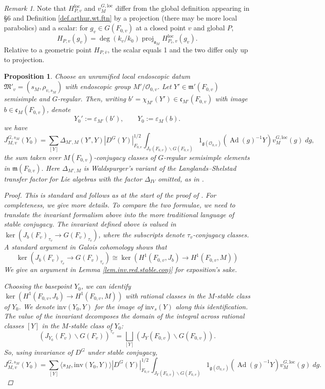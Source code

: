 \documentclass[openany]{amsbook}
\newtheorem{proposition}[theorem]{Proposition}
\theoremstyle{definition}
\theoremstyle{remark}
\newtheorem{remark}[theorem]{Remark}
\numberwithin{equation}{section}
\renewcommand{\O}{\mathcal{O}}
\newcommand{\ol}[1]{\overline{#1}}
\renewcommand{\epsilon}{\varepsilon}
\renewcommand{\-}{\operatorname{-}}
\renewcommand{\a}{\mathfrak{a}}
\newcommand{\on}[1]{\operatorname{#1}}
\newcommand{\fm}{\mathfrak{m}}
\newcommand{\fc}{\mathfrak{c}}
\renewcommand{\fm}{\mathfrak{m}}
\renewcommand{\fg}{\mathfrak{g}}
\newcommand{\fM}{\mathfrak{M}}
\newcommand{\Ad}{\on{Ad}}
\newcommand{\inv}{\mathrm{inv}}
\newcommand{\loc}{\mathrm{loc}}
\begin{document}
\begin{remark}
    Note that $H_{P,v}^{\loc}$ and $v_M^{G, \loc}$ differ from the global definition appearing in \S 6 and Definition \ref{def.arthur.wt.ftn} by a projection (there may be more local parabolics) and a scalar: for $g_v \in G(F_{0,v})$ at a closed point $v$ and global $P$,
    $$
        H_{P,v}(g_v) = \deg(k_v/k_0) \on{proj}_{\a_M} H_{P_v,v}^{\loc}(g_v).
    $$
    Relative to a geometric point $H_{P, \ol{v}}$, the scalar equals 1 and the two differ only up to projection.
\end{remark}

\begin{proposition}\label{prop.comparison.local.s}
    Choose an unramified local endoscopic datum $\fM'_v = (s_M, \rho_{v,s_M})$ with endoscopic group $M'/\O_{0,v}$. Let $Y' \in \fm'(F_{0,v})$ semisimple and $G$-regular. Then, writing $b' = \chi_{M'}(Y') \in \fc_{M'}(F_{0,v})$ with image $b \in \fc_M(F_{0,v})$, denote
    $$
        Y_0' := \epsilon_{M'}(b'), \qquad Y_0 := \epsilon_{M}(b).
    $$
    we have
    $$
        J^{G,s_M}_{M,v}(Y_0) = \sum_{[Y]} \Delta_{M',M}(Y',Y) |D^G(Y)|^{1/2}_{F_{0,v}} \int_{J_Y(F_{0,v})\backslash G(F_{0,v})} 1_{\fg(\O_{0,v})}(\Ad(g)^{-1} Y) v_M^{G,\loc}(g) \; dg,
    $$
    the sum taken over $M(F_{0,v})$-conjugacy classes of $G$-regular semisimple elements in $\fm(F_{0,v})$. Here $\Delta_{M', M}$ is Waldspurger's variant of the Langlands--Shelstad transfer factor for Lie algebras with the factor $\Delta_{IV}$ omitted, as in \cite{waldFLimpliquetransfert}.
    \begin{proof}
        This is standard and follows as at the start of the proof of \cite[Theorem 19.1.1]{CLII}. For completeness, we give more details. To compare the two formulae, we need to translate the invariant formalism above into the more traditional language of stable conjugacy. The invariant defined above is valued in $\ker(J_b(F_v)_{\tau_v} \to G(F_v)_{\tau_v})$, where the subscripts denote ${\tau_v}$-conjugacy classes. A standard argument in Galois cohomology shows that 
        $$
            \ker(J_b(F_v)_{\tau_v} \to G(F_v)_{\tau_v}) \cong \ker(H^1(F_{0,v}, J_b) \to H^1(F_{0,v}, M))
        $$
        We give an argument in Lemma \ref{lem.inv.red.stable.conj} for exposition's sake.

        Choosing the basepoint $Y_0$, we can identify $\ker(H^1(F_{0,v}, J_b) \to H^1(F_{0,v}, M))$ with rational classes in the $M$-stable class of $Y_0$. We denote $\inv(Y_0, Y)$ for the image of $\inv_{s}(Y)$ along this identification. The value of the invariant decomposes the domain of the integral across rational classes $[Y]$ in the $M$-stable class of $Y_0$:
        $$
            (J_{Y_0}(F_v)\backslash G(F_v))^{{\tau_v}} = \bigsqcup_{[Y]} (J_Y(F_{0,v}) \backslash G(F_{0,v})).
        $$
        So, using invariance of $D^G$ under stable conjugacy,
        $$
            J_{M,v}^{G,s_M}(Y_0) = \sum_{[Y]} \langle s_M, \inv(Y_0, Y) \rangle |D^G(Y)|^{1/2}_{F_{0,v}} \int_{J_Y(F_{0,v}) \backslash G(F_{0,v})} 1_{\fg(\O_{0,v})}(\Ad(g)^{-1} Y) v_M^{G, \loc}(g) \; dg.
        $$


\end{proof}
\end{proposition}
\end{document}

